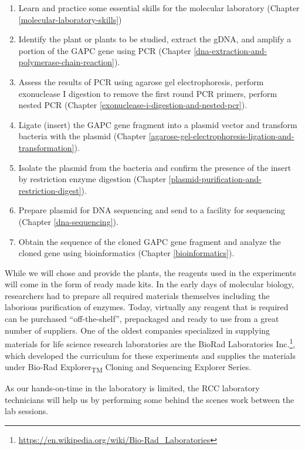 \documentclass[]{book}
\providecommand{\tightlist}{%
  \setlength{\itemsep}{0pt}\setlength{\parskip}{0pt}}
\let\rmarkdownfootnote\footnote%
\def\footnote{\protect\rmarkdownfootnote}
\renewcommand{\href}[2]{#2\footnote{\url{#1}}}
\theoremstyle{definition}
\theoremstyle{definition}
\theoremstyle{definition}
\theoremstyle{remark}
\begin{document}
\begin{enumerate}
\def\labelenumi{\arabic{enumi}.}
\tightlist
\item
  Learn and practice some essential skills for the molecular laboratory
  (Chapter \ref{molecular-laboratory-skills})
\item
  Identify the plant or plants to be studied, extract the gDNA, and
  amplify a portion of the GAPC gene using PCR (Chapter
  \ref{dna-extraction-and-polymerase-chain-reaction}).
\item
  Assess the results of PCR using agarose gel electrophoresis, perform
  exonuclease I digestion to remove the first round PCR primers, perform
  nested PCR (Chapter \ref{exonuclease-i-digestion-and-nested-pcr}).
\item
  Ligate (insert) the GAPC gene fragment into a plasmid vector and
  transform bacteria with the plasmid (Chapter
  \ref{agarose-gel-electrophoresis-ligation-and-transformation}).
\item
  Isolate the plasmid from the bacteria and confirm the presence of the
  insert by restriction enzyme digestion (Chapter
  \ref{plasmid-purification-and-restriction-digest}).
\item
  Prepare plasmid for DNA sequencing and send to a facility for
  sequencing (Chapter \ref{dna-sequencing}).
\item
  Obtain the sequence of the cloned GAPC gene fragment and analyze the
  cloned gene using bioinformatics (Chapter \ref{bioinformatics}).
\end{enumerate}

While we will chose and provide the plants, the reagents used in the
experiments will come in the form of ready made kits. In the early days
of molecular biology, researchers had to prepare all required materials
themselves including the laborious purification of enzymes. Today,
virtually any reagent that is required can be purchased
``off-the-shelf'', prepackaged and ready to use from a great number of
suppliers. One of the oldest companies specialized in supplying
materials for life science research laboratories are the
\href{https://en.wikipedia.org/wiki/Bio-Rad_Laboratories}{BioRad
Laboratories Inc.}, which developed the curriculum for these experiments
and supplies the materials under Bio-Rad Explorer\textsubscript{TM}
Cloning and Sequencing Explorer Series.

As our hands-on-time in the laboratory is limited, the RCC laboratory
technicians will help us by performing some behind the scenes work
between the lab sessions.
\end{document}
